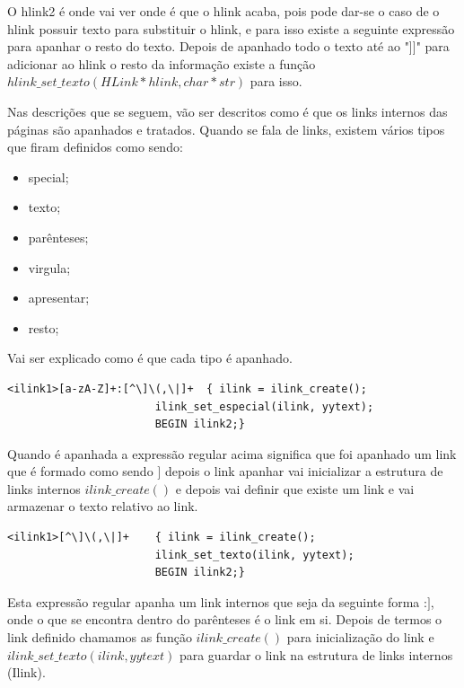 \documentclass[11pt, a4paper, oneside]{article}
\begin{document}
O hlink2 é onde vai ver onde é que o hlink acaba, pois pode dar-se o caso de o hlink possuir texto para substituir o hlink, e para isso existe a seguinte expressão para apanhar o resto do texto. Depois de apanhado todo o texto até ao "]]" para adicionar ao hlink o resto da informação existe a função \begin{math} hlink\_set\_texto(HLink* hlink, char* str) \end{math} para isso.

Nas descrições que se seguem, vão ser descritos como é que os links internos das páginas são apanhados e tratados.
Quando se fala de links, existem vários tipos que firam definidos como sendo:
\begin{itemize}
\item special;
\item texto;
\item parênteses;
\item virgula;
\item apresentar;
\item resto;
\end{itemize}


Vai ser explicado como é que cada tipo é apanhado.

\begin{verbatim}
<ilink1>[a-zA-Z]+:[^\]\(,\|]+  { ilink = ilink_create();
                       ilink_set_especial(ilink, yytext); 
                       BEGIN ilink2;}
\end{verbatim}


Quando é apanhada a expressão regular acima significa que foi apanhado um link que é formado como sendo \begin{math}[[Category:Salts]]\end{math} depois o link apanhar vai inicializar a estrutura de links internos \begin{math} ilink\_create() \end{math} e depois vai definir que existe um link e vai armazenar o texto relativo ao link.

\begin{verbatim}
<ilink1>[^\]\(,\|]+    { ilink = ilink_create();
                       ilink_set_texto(ilink, yytext);
                       BEGIN ilink2;}
\end{verbatim}
Esta expressão regular apanha um link internos que seja da seguinte forma :\begin{math}[[Salts]]\end{math}, onde o que se encontra dentro do parênteses é o link em si. Depois de termos o link definido chamamos as função \begin{math} ilink\_create() \end{math} para inicialização do link e  \begin{math}ilink\_set\_texto(ilink, yytext)\end{math} para guardar o link na estrutura de links internos (Ilink).
\end{document}
